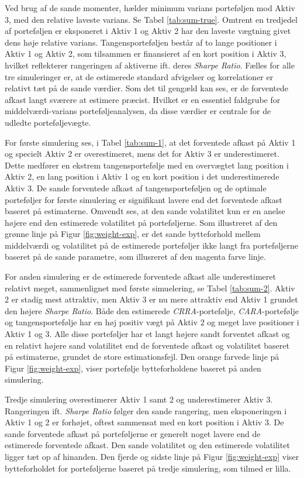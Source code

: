 \documentclass[
  a4paper,
  oneside]{memoir}
\begin{document}
Ved brug af de sande momenter, hælder minimum varians porteføljen mod Aktiv 3, med den relative laveste varians. Se Tabel \ref{tab:sum-true}. Omtrent en tredjedel af porteføljen er eksponeret i Aktiv 1 og Aktiv 2 har den laveste vægtning givet dens høje relative varians. Tangensporteføljen består af to lange positioner i Aktiv 1 og Aktiv 2, som tilsammen er finansieret af en kort position i Aktiv 3, hvilket reflekterer rangeringen af aktiverne ift. deres \emph{Sharpe Ratio}.
Fælles for alle tre simuleringer er, at de estimerede standard afvigelser og korrelationer er relativt tæt på de sande værdier. Som det til gengæld kan ses, er de forventede afkast langt sværere at estimere præcist. Hvilket er en essentiel faldgrube for middelværdi-varians porteføljeanalysen, da disse værdier er centrale for de udledte porteføljevægte.

For første simulering ses, i Tabel \ref{tab:sum-1}, at det forventede afkast på Aktiv 1 og specielt Aktiv 2 er overestimeret, mens det for Aktiv 3 er underestimeret. Dette medfører en ekstrem tangensportefølje med en overvægtet lang position i Aktiv 2, en lang position i Aktiv 1 og en kort position i det underestimerede Aktiv 3. De sande forventede afkast af tangensporteføljen og de optimale porteføljer for første simulering er signifikant lavere end det forventede afkast baseret på estimaterne. Omvendt ses, at den sande volatilitet kun er en anelse højere end den estimerede volatilitet på porteføljerne. Som illustreret af den grønne linje på Figur \ref{fig:weight-exp}, er det sande bytteforhold mellem middelværdi og volatilitet på de estimerede porteføljer ikke langt fra porteføljerne baseret på de sande parametre, som illusreret af den magenta farve linje.

For anden simulering er de estimerede forventede afkast alle underestimeret relativt meget, sammenlignet med første simuelering, se Tabel \ref{tab:sum-2}. Aktiv 2 er stadig mest attraktiv, men Aktiv 3 er nu mere attraktiv end Aktiv 1 grundet den højere \emph{Sharpe Ratio}. Både den estimerede \emph{CRRA}-portefølje, \emph{CARA}-portefølje og tangensportefølje har en høj positiv vægt på Aktiv 2 og meget lave positioner i Aktiv 1 og 3. Alle disse porteføljer har et langt højere sandt forventet afkast og en relativt højere sand volatilitet end de forventede afkast og volatilitet baseret på estimaterne, grundet de store estimationsfejl. Den orange farvede linje på Figur \ref{fig:weight-exp}, viser portefølje bytteforholdene baseret på anden simulering.

Tredje simulering overestimerer Aktiv 1 samt 2 og underestimerer Aktiv 3. Rangeringen ift. \emph{Sharpe Ratio} følger den sande rangering, men eksponeringen i Aktiv 1 og 2 er forhøjet, oftest sammensat med en kort position i Aktiv 3. De sande forventede afkast på porteføljerne er generelt noget lavere end de estimerede forventede afkast. Den sande volatilitet og den estimerede volatilitet ligger tæt op af hinanden. Den fjerde og sidste linje på Figur \ref{fig:weight-exp} viser bytteforholdet for porteføljerne baseret på tredje simulering, som tilmed er lilla.
\end{document}
